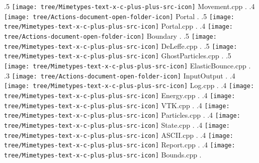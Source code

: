 {.5 { \texttt{[image: tree/Mimetypes-text-x-c-plus-plus-src-icon]} Movement.cpp }.
.4 { \texttt{[image: tree/Actions-document-open-folder-icon]} Portal }.
.5 { \texttt{[image: tree/Mimetypes-text-x-c-plus-plus-src-icon]} Portal.cpp }.
.4 { \texttt{[image: tree/Actions-document-open-folder-icon]} Boundary }.
.5 { \texttt{[image: tree/Mimetypes-text-x-c-plus-plus-src-icon]} DeLeffe.cpp }.
.5 { \texttt{[image: tree/Mimetypes-text-x-c-plus-plus-src-icon]} GhostParticles.cpp }.
.5 { \texttt{[image: tree/Mimetypes-text-x-c-plus-plus-src-icon]} ElasticBounce.cpp }.
.3 { \texttt{[image: tree/Actions-document-open-folder-icon]} InputOutput }.
.4 { \texttt{[image: tree/Mimetypes-text-x-c-plus-plus-src-icon]} Log.cpp }.
.4 { \texttt{[image: tree/Mimetypes-text-x-c-plus-plus-src-icon]} Energy.cpp }.
.4 { \texttt{[image: tree/Mimetypes-text-x-c-plus-plus-src-icon]} VTK.cpp }.
.4 { \texttt{[image: tree/Mimetypes-text-x-c-plus-plus-src-icon]} Particles.cpp }.
.4 { \texttt{[image: tree/Mimetypes-text-x-c-plus-plus-src-icon]} State.cpp }.
.4 { \texttt{[image: tree/Mimetypes-text-x-c-plus-plus-src-icon]} ASCII.cpp }.
.4 { \texttt{[image: tree/Mimetypes-text-x-c-plus-plus-src-icon]} Report.cpp }.
.4 { \texttt{[image: tree/Mimetypes-text-x-c-plus-plus-src-icon]} Bounds.cpp }.
}

